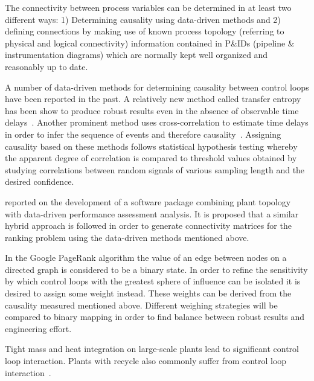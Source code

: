 \documentclass{article}
\begin{document}

The connectivity between process variables can be determined in at least two different ways: 1) Determining causality using data-driven methods and 2) defining connections by making use of known process topology (referring to physical and logical connectivity) information contained in P\&IDs (pipeline \& instrumentation diagrams) which are normally kept well organized and reasonably up to date.

A number of data-driven methods for determining causality between control loops have been reported in the past.
A relatively new method called transfer entropy has been show to produce robust results even in the absence of observable time delays~\cite{Bauer2007}.
Another prominent method uses cross-correlation to estimate time delays in order to infer the sequence of events and therefore causality~\cite{Bauer2008}.
Assigning causality based on these methods follows statistical hypothesis testing whereby the apparent degree of correlation is compared to threshold values obtained by studying correlations between random signals of various sampling length and the desired confidence.

\citet{Yim2006} reported on the development of a software package combining plant topology with data-driven performance assessment analysis.
It is proposed that a similar hybrid approach is followed in order to generate connectivity matrices for the ranking problem using the data-driven methods mentioned above.

In the Google PageRank algorithm the value of an edge between nodes on a directed graph is considered to be a binary state.
In order to refine the sensitivity by which control loops with the greatest sphere of influence can be isolated it is desired to assign some weight instead.
These weights can be derived from the causality measured mentioned above.
Different weighing strategies will be compared to binary mapping in order to find balance between robust results and engineering effort.

Tight mass and heat integration on large-scale plants lead to significant control loop interaction.
Plants with recycle also commonly suffer from control loop interaction~\citep{Bauer2005a}.
\end{document}
